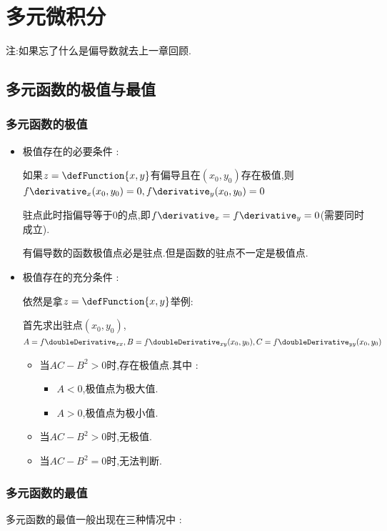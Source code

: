 \section{多元微积分}{
注:如果忘了什么是偏导数就去上一章回顾.

\subsection{多元函数的极值与最值}{

  \subsubsection{多元函数的极值}{
    \begin{itemize}
      \item {
            极值存在的必要条件 :

            如果$z = \defFunction{x,y}$有偏导且在$(x_0,y_0)$存在极值,则$f\derivative_x(x_0,y_0) = 0,f\derivative_y(x_0,y_0) = 0$

            驻点此时指偏导等于0的点,即$f\derivative_x = f\derivative_y = 0$(需要同时成立).

            有偏导数的函数极值点必是驻点.但是函数的驻点不一定是极值点.
            }
      \item {
            极值存在的充分条件 :

            依然是拿$z = \defFunction{x,y}$举例:

            首先求出驻点$(x_0,y_0)$,$A = f\doubleDerivative_{xx},B = f\doubleDerivative_{xy}(x_0,y_0),C = f\doubleDerivative_{yy}(x_0,y_0)$

            \begin{itemize}
              \item {当$AC-B^2 > 0$时,存在极值点.其中 :
                    \begin{itemize}
                      \item $A < 0$,极值点为极大值.
                      \item $A > 0$,极值点为极小值.
                    \end{itemize}
                    }
              \item 当$AC - B^2 > 0$时,无极值.
              \item 当$AC - B^2 = 0$时,无法判断.
            \end{itemize}
            }
    \end{itemize}
  }%

  \subsubsection{多元函数的最值}{
    多元函数的最值一般出现在三种情况中 :

}}}
